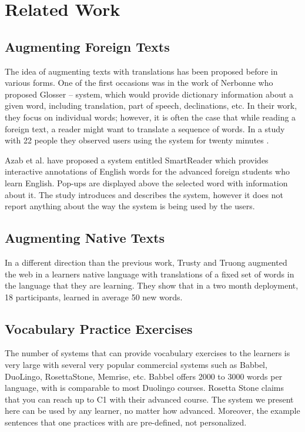
\newpage
\section{Related Work}


\subsection{Augmenting Foreign Texts}
The idea of augmenting texts with translations has been proposed before in various forms. One of the first occasions was in the work of Nerbonne \cite{Nerb99-Assistant} who proposed Glosser -- system, which would provide dictionary information about a given word, including translation, part of speech, declinations, etc. In their work, they focus on individual words; however, it is often the case that while reading a foreign text, a reader might want to translate a sequence of words. In a study with 22 people they observed users using the system for twenty minutes \cite{Dokter98-UserStudy}.

Azab et al. \cite{Azab13-nlp} have proposed a system entitled SmartReader which provides interactive annotations of English words for the advanced foreign students who learn English. Pop-ups are displayed above the selected word with information about it. The study introduces and describes the system, however it does not report anything about the way the system is being used by the users.

\subsection{Augmenting Native Texts}
In a different direction than the previous work, Trusty and Truong augmented the web in a learners native language with translations of a fixed set of words in the language that they are learning\cite{Trus11web}. They show that in a two month deployment, 18 participants, learned in average 50 new words.

\subsection{Vocabulary Practice Exercises}
The number of systems that can provide vocabulary exercises to the learners is very large with several very popular commercial systems such as Babbel, DuoLingo, RosettaStone, Memrise, etc. Babbel offers 2000 to 3000 words per language, with is comparable to most Duolingo courses. Rosetta Stone claims that you can reach up to C1 with their advanced course. The system we present here can be used by any learner, no matter how advanced. Moreover, the example sentences that one practices with are pre-defined, not personalized.

